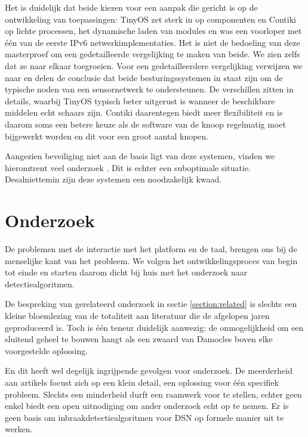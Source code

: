 Het is duidelijk dat beide kiezen voor een aanpak die gericht is op de
ontwikkeling van toepassingen: TinyOS zet sterk in op componenten en Contiki op
lichte processen, het dynamische laden van modules en was een voorloper met
\'e\'en van de eerste IPv6 netwerkimplementaties. Het is niet de bedoeling van
deze masterproef om een gedetailleerde vergelijking te maken van beide. We zien
zelfs dat ze naar elkaar toegroeien. Voor een gedetailleerdere vergelijking
verwijzen we naar \citep{reusing2012comparison} en delen de conclusie dat beide
besturingssystemen in staat zijn om de typische noden van een sensornetwerk te
ondersteunen. De verschillen zitten in details, waarbij TinyOS typisch beter
uitgerust is wanneer de beschikbare middelen echt schaars zijn. Contiki
daarentegen biedt meer flexibiliteit en is daarom soms een betere keuze als de
software van de knoop regelmatig moet bijgewerkt worden en dit voor een groot
aantal knopen.

Aangezien beveiliging niet aan de basis ligt van deze systemen, vinden we
hieromtrent veel onderzoek \citep{paul2009safe, casado2009contikisec,
karlof2004tinysec}. Dit is echter een suboptimale situatie. Desalniettemin zijn
deze systemen een noodzakelijk kwaad.

\section{Onderzoek}
\label{section:problem-research}

De problemen met de interactie met het platform en de taal, brengen ons bij de
menselijke kant van het probleem. We volgen het ontwikkelingsproces van begin
tot einde en starten daarom dicht bij huis met het onderzoek naar
detectiealgoritmen.

De bespreking van gerelateerd onderzoek in sectie \ref{section:related} is
slechts een kleine bloemlezing van de totaliteit aan literatuur die de
afgelopen jaren geproduceerd is. Toch is \'e\'en teneur duidelijk aanwezig: de
onmogelijkheid om een sluitend geheel te bouwen hangt als een zwaard van
Damocles boven elke voorgestelde oplossing.

En dit heeft wel degelijk ingrijpende gevolgen voor onderzoek. De meerderheid
aan artikels focust zich op een klein detail, een oplossing voor \'e\'en
specifiek probleem. Slechts een minderheid durft een raamwerk voor te stellen,
echter geen enkel biedt een open uitnodiging om ander onderzoek echt op te
nemen. Er is geen basis om inbraakdetectiealgoritmen voor DSN op formele manier
uit te werken.


